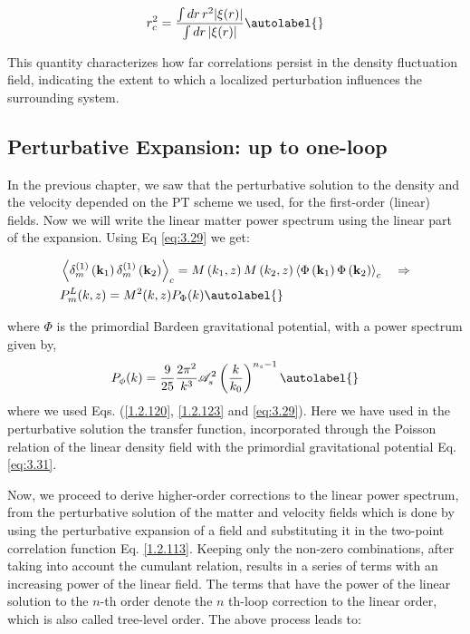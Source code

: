 \begin{equation}
    r_{c}^{2} = \frac{\int dr \, r^2 |\xi(r)|}{\int dr \, |\xi(r)|} \autolabel{}
\end{equation}

This quantity characterizes how far correlations persist in the density fluctuation field, indicating the extent to which a localized perturbation influences the surrounding system.


\subsection{ Perturbative Expansion: up to one-loop}

In the previous chapter, we saw that the perturbative solution to the density and the velocity depended on the PT scheme we used, for the first-order (linear) fields. Now we will write the linear matter power spectrum using the linear part of the expansion. Using Eq \ref{eq:3.29} we get:


\begin{align*}
    & \left\langle\delta_{m}^{(1)}\left(\mathbf{k}_{1}\right) \delta_{m}^{(1)}\left(\mathbf{k}_{2}\right)\right\rangle_{c}=M\left(k_{1}, z\right) M\left(k_{2}, z\right)\left\langle\Phi\left(\mathbf{k}_{1}\right) \Phi\left(\mathbf{k}_{2}\right)\right\rangle_{c} \quad \Rightarrow \\
    & P_{m}^{L}(k, z)=M^{2}(k, z) P_{\Phi}(k) \autolabel{}
\end{align*}


where $\Phi$ is the primordial Bardeen gravitational potential, with a power spectrum given by,
\begin{equation}
    P_{\phi}(k) = \frac{9}{25}\frac{2\pi^{2}}{k^{3}} \mathcal{A}_{s}^{2}\left(\frac{k}{k_{0}}\right)^{n_{s}-1} \autolabel{}
\end{equation}
where we used Eqs. (\ref{1.2.120}, \ref{1.2.123} and \ref{eq:3.29}).
Here we have used in the perturbative solution the transfer function, incorporated through the Poisson relation of the linear density field with the primordial gravitational potential Eq. \ref{eq:3.31}. 

Now, we proceed to derive higher-order corrections to the linear power spectrum, from the perturbative solution of the matter and velocity fields which is done by using the perturbative expansion of a field and substituting it in the two-point correlation function Eq. \ref{1.2.113}. Keeping only the non-zero combinations, after taking into account the cumulant relation, results in a series of terms with an increasing power of the linear field. The terms that have the power of the linear solution to the $n$-th order denote the $n$ th-loop correction to the linear order, which is also called tree-level order. The above process leads to:


